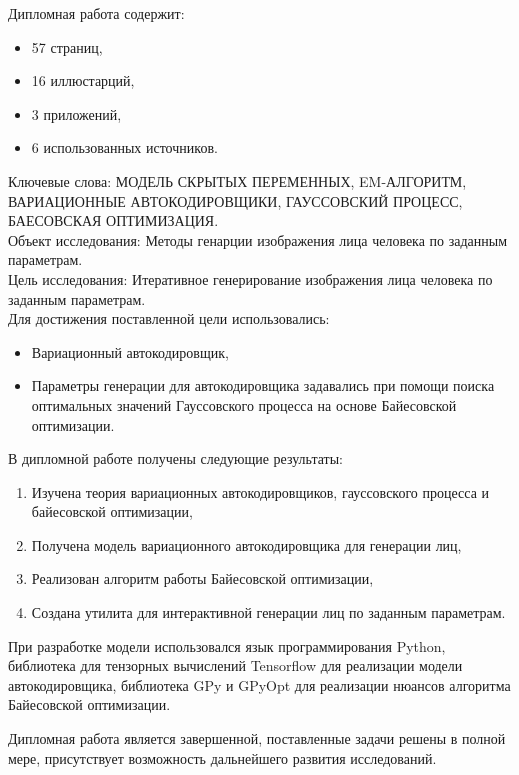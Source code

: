 Дипломная работа содержит:
\begin{itemize}
	\setlength{\itemindent}{2em}
	\setlength\itemsep{0.1em}
	\item 57 страниц,
	\item 16 иллюстарций,
	\item 3 приложений,
	\item 6 использованных источников.
\end{itemize}

\indent
Ключевые слова: МОДЕЛЬ СКРЫТЫХ ПЕРЕМЕННЫХ, EM-АЛГОРИТМ, ВАРИАЦИОННЫЕ АВТОКОДИРОВЩИКИ, ГАУССОВСКИЙ ПРОЦЕСС, БАЕСОВСКАЯ ОПТИМИЗАЦИЯ. \\
\indent
Объект исследования: Методы генарции изображения лица человека по заданным параметрам. \\
\indent
Цель исследования: Итеративное генерирование изображения лица человека по заданным параметрам. \\
\indent
Для достижения поставленной цели использовались:
\begin{itemize}
	\setlength{\itemindent}{2em}
	\setlength\itemsep{0.1em}
	\item Вариационный автокодировщик,
	\item Параметры генерации для автокодировщика задавались при помощи поиска оптимальных значений Гауссовского процесса на основе Байесовской оптимизации.
\end{itemize}

\indent
В дипломной работе получены следующие результаты:
\begin{enumerate}
	\setlength{\itemindent}{2em}
	\setlength\itemsep{0.1em}
	\item Изучена теория вариационных автокодировщиков, гауссовского процесса и байесовской оптимизации,
	\item Получена модель вариационного автокодировщика для генерации лиц,
	\item Реализован алгоритм работы Байесовской оптимизации,
	\item Создана утилита для интерактивной генерации лиц по заданным параметрам.  
\end{enumerate}

При разработке модели использовался язык программирования Python, библиотека для тензорных вычислений Tensorflow для реализации модели автокодировщика, библиотека GPy и GPyOpt для реализации нюансов алгоритма Байесовской оптимизации.

Дипломная работа является завершенной, поставленные задачи решены в полной мере, присутствует возможность дальнейшего развития исследований.

